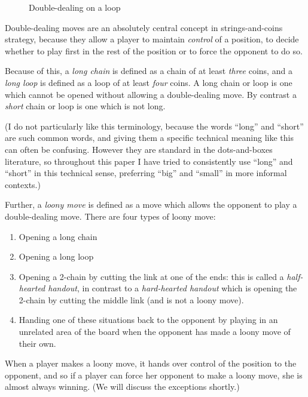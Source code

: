 \documentclass[a4paper,twocolumn]{article}
\begin{document}
\begin{figure}
  \centering
  \def\svgscale{0.7}
  
  \caption{Double-dealing on a loop}
  \label{loopdoubledeal}
\end{figure}

Double-dealing moves are an absolutely central concept in
strings-and-coins strategy, because they allow a player to maintain
\emph{control} of a position, to decide whether to play first in the
rest of the position or to force the opponent to do so.

Because of this, a \emph{long chain} is defined as a chain of at least
\emph{three} coins, and a \emph{long loop} is defined as a loop of at
least \emph{four} coins. A long chain or loop is one which cannot be
opened without allowing a double-dealing move. By contrast a
\emph{short} chain or loop is one which is not long.

(I do not particularly like this terminology, because the words
``long'' and ``short'' are such common words, and giving them a
specific technical meaning like this can often be confusing. However
they are standard in the dots-and-boxes literature, so throughout this
paper I have tried to consistently use ``long'' and ``short'' in this
technical sense, preferring ``big'' and ``small'' in more informal
contexts.)

Further, a \emph{loony move} is defined as a move which allows the
opponent to play a double-dealing move. There are four types of loony
move:

\begin{enumerate}
  \item Opening a long chain
  \item Opening a long loop
  \item Opening a 2-chain by cutting the link at one of the ends:
    this is called a \emph{half-hearted handout}, in contrast to a
    \emph{hard-hearted handout} which is opening the 2-chain by
    cutting the middle link (and is not a loony move).
  \item Handing one of these situations back to the opponent by
    playing in an unrelated area of the board when the opponent has
    made a loony move of their own.
\end{enumerate}

When a player makes a loony move, it hands over control of the
position to the opponent, and so if a player can force her opponent to
make a loony move, she is almost always winning. (We will discuss the
exceptions shortly.)
\end{document}
